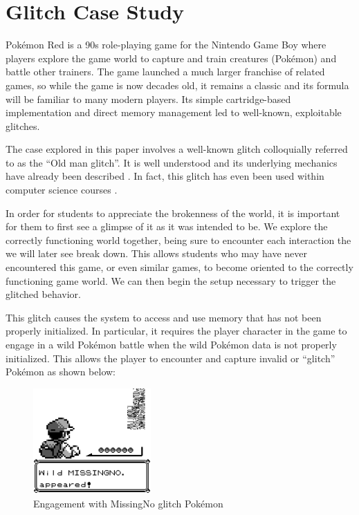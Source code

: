 \documentclass[letterpaper]{article}
\begin{document}
\section{Glitch Case Study}
Pokémon Red is a 90s role-playing game for the Nintendo Game Boy where players explore the game world to capture and train creatures (Pokémon) and battle other trainers. The game launched a much larger franchise of related games, so while the game is now decades old, it remains a classic and its formula will be familiar to many modern players. Its simple cartridge-based implementation and direct memory management led to well-known, exploitable glitches.

The case explored in this paper involves a well-known glitch colloquially referred to as the ``Old man glitch''. It is well understood and its underlying mechanics have already been described \cite{bulbapedia2005} \cite{scrumpy2016missing}. In fact, this glitch has even been used within computer science courses \cite{rjwalls2022}.

In order for students to appreciate the brokenness of the world, it is important for them to first see a glimpse of it as it was intended to be. We explore the correctly functioning world together, being sure to encounter each interaction the we will later see break down. This allows students who may have never encountered this game, or even similar games, to become oriented to the correctly functioning game world. We can then begin the setup necessary to trigger the glitched behavior.

This glitch causes the system to access and use memory that has not been properly initialized. In particular, it requires the player character in the game to engage in a wild Pokémon battle when the wild Pokémon data is not properly initialized. This allows the player to encounter and capture invalid or ``glitch'' Pokémon as shown below:

\begin{figure}[h!]
    \centering
    \includegraphics[width=0.4\textwidth]{missingno.png}
    \caption{Engagement with MissingNo glitch Pokémon}
\end{figure}
\end{document}
